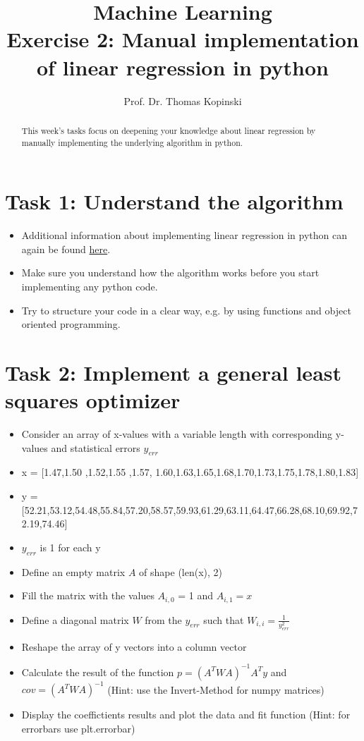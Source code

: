 \documentclass{article}
\title{Machine Learning \\ Exercise 2: Manual implementation of linear regression in python}
\author{Prof. Dr. Thomas Kopinski}
\begin{document}
\maketitle

\begin{abstract}
This week's tasks focus on deepening your knowledge about linear regression by manually implementing the underlying algorithm in python. 
\end{abstract}

\section*{Task 1: Understand the algorithm}

\begin{itemize}
    \item Additional information about implementing linear regression in python can again be found \href{https://github.com/DataScienceLabFHSWF/machine-learning-book/blob/main/notebooks/ch09/ch09.ipynb}{here}.
    \item Make sure you understand how the algorithm works before you start implementing any python code.
    \item Try to structure your code in a clear way, e.g. by using functions and object oriented programming.
\end{itemize}
\section*{Task 2: Implement a general least squares optimizer}

\begin{itemize}
    \item Consider an array of x-values with a variable length with corresponding y-values and statistical errors $y_{err}$
    \item x = [1.47,1.50 ,1.52,1.55 ,1.57, 1.60,1.63,1.65,1.68,1.70,1.73,1.75,1.78,1.80,1.83]
    \item y = [52.21,53.12,54.48,55.84,57.20,58.57,59.93,61.29,63.11,64.47,66.28,68.10,69.92,72.19,74.46]
    \item $y_{err}$ is 1 for each y
    \item Define an empty matrix $A$ of shape (len(x), 2)
    \item Fill the matrix with the values $A_{i,0}$ = 1 and $A_{i,1}=x$
    \item Define a diagonal matrix $W$ from the $y_{err}$ such that $W_{i,i} = \frac{1}{y_{err}^2} $
    \item Reshape the array of y vectors into a column vector
    \item Calculate the result of the function $p = (A^T W A)^{-1} A^T y$ and $cov = (A^T W A)^{-1}$ (Hint: use the Invert-Method for numpy matrices)
    \item Display the coeffictients results and plot the data and fit function (Hint: for errorbars use plt.errorbar)
\end{itemize}

%
%
\end{document}
